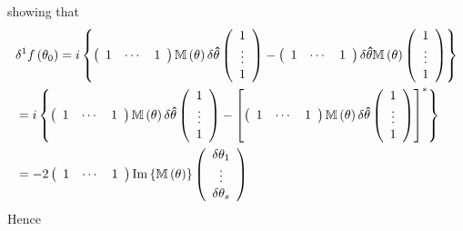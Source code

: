 \documentclass[aps,preprint]{revtex4}%
\begin{document}
showing that
\begin{align}
&  \delta^{1}f\left(  \mathbf{\theta}_{0}\right)  =i\left\{  \left(
\begin{array}
[c]{ccc}%
1 & \cdots & 1
\end{array}
\right)  \mathbb{M}\left(  \mathbf{\theta}\right)  \delta\mathbf{\hat{\theta}%
}\left(
\begin{array}
[c]{c}%
1\\
\vdots\\
1
\end{array}
\right)  -\left(
\begin{array}
[c]{ccc}%
1 & \cdots & 1
\end{array}
\right)  \delta\mathbf{\hat{\theta}}\mathbb{M}\left(  \mathbf{\theta}\right)
\left(
\begin{array}
[c]{c}%
1\\
\vdots\\
1
\end{array}
\right)  \right\}  \nonumber\\
&  =i\left\{  \left(
\begin{array}
[c]{ccc}%
1 & \cdots & 1
\end{array}
\right)  \mathbb{M}\left(  \mathbf{\theta}\right)  \delta\mathbf{\hat{\theta}%
}\left(
\begin{array}
[c]{c}%
1\\
\vdots\\
1
\end{array}
\right)  -\left[  \left(
\begin{array}
[c]{ccc}%
1 & \cdots & 1
\end{array}
\right)  \mathbb{M}\left(  \mathbf{\theta}\right)  \delta\mathbf{\hat{\theta}%
}\left(
\begin{array}
[c]{c}%
1\\
\vdots\\
1
\end{array}
\right)  \right]  ^{\ast}\right\}  \nonumber\\
&  =-2\left(
\begin{array}
[c]{ccc}%
1 & \cdots & 1
\end{array}
\right)  \operatorname{Im}\left\{  \mathbb{M}\left(  \mathbf{\theta}\right)
\right\}  \left(
\begin{array}
[c]{c}%
\delta\theta_{1}\\
\vdots\\
\delta\theta_{s}%
\end{array}
\right)
\end{align}
Hence
\end{document}
